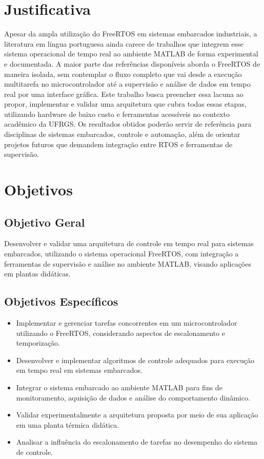 \documentclass[repeatfields,xlists,xpacks,oneside]{ufrgscca}
\begin{document}
\section{Justificativa}

Apesar da ampla utilização do FreeRTOS em sistemas embarcados industriais, a literatura em
língua portuguesa ainda carece de trabalhos que integrem esse sistema operacional de tempo real
ao ambiente MATLAB de forma experimental e documentada. A maior parte das referências disponíveis
aborda o FreeRTOS de maneira isolada, sem contemplar o fluxo completo que vai desde a execução
multitarefa no microcontrolador até a supervisão e análise de dados em tempo real por uma interface
gráfica. Este trabalho busca preencher essa lacuna ao propor, implementar e validar uma arquitetura
que cubra todas essas etapas, utilizando hardware de baixo custo e ferramentas acessíveis no contexto
acadêmico da UFRGS. Os resultados obtidos poderão servir de referência para disciplinas de sistemas
embarcados, controle e automação, além de orientar projetos futuros que demandem integração entre
RTOS e ferramentas de supervisão.

\section{Objetivos}

\subsection{Objetivo Geral}

Desenvolver e validar uma arquitetura de controle em tempo real para sistemas embarcados, utilizando o sistema operacional FreeRTOS, com integração a ferramentas de supervisão e análise no ambiente MATLAB, visando aplicações em plantas didáticas.

\subsection{Objetivos Específicos}

\begin{itemize}
    \item Implementar e gerenciar tarefas concorrentes em um microcontrolador utilizando o FreeRTOS, considerando aspectos de escalonamento e temporização.

    \item Desenvolver e implementar algoritmos de controle adequados para execução em tempo real em sistemas embarcados.

    \item Integrar o sistema embarcado ao ambiente MATLAB para fins de monitoramento, aquisição de dados e análise do comportamento dinâmico.

    \item Validar experimentalmente a arquitetura proposta por meio de sua aplicação em uma planta térmica didática.

    \item Analisar a influência do escalonamento de tarefas no desempenho do sistema de controle.
\end{itemize}
\end{document}
